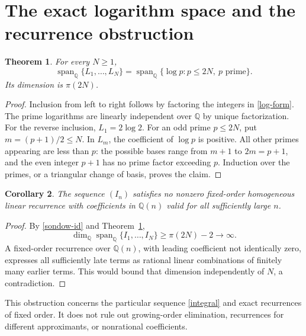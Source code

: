 \documentclass[11pt,a4paper]{article}
\newtheorem{theorem}{Theorem}[section]
\newtheorem{corollary}[theorem]{Corollary}
\theoremstyle{remark}\newtheorem{remark}[theorem]{Remark}
\newcommand{\Q}{\mathbb Q}\newcommand{\Z}{\mathbb Z}
\newcommand{\spanQ}{\operatorname{span}_{\mathbb Q}}
\begin{document}
\section{The exact logarithm space and the recurrence obstruction}
\begin{theorem}\label{log-rank}
For every $N\ge1$,
\[
 \spanQ\{L_1,\ldots,L_N\}
 =\spanQ\{\log p:p\le2N,\ p\text{ prime}\}.
\]
Its dimension is $\pi(2N)$.
\end{theorem}
\begin{proof}
Inclusion from left to right follows by factoring the integers in
\eqref{log-form}. The prime logarithms are linearly independent over $\Q$
by unique factorization. For the reverse inclusion, $L_1=2\log2$.
For an odd prime $p\le2N$, put $m=(p+1)/2\le N$. In $L_m$, the coefficient
of $\log p$ is positive. All other primes appearing are less than $p$:
the possible bases range from $m+1$ to $2m=p+1$, and the even integer
$p+1$ has no prime factor exceeding $p$. Induction over the primes, or a
triangular change of basis, proves the claim.
\end{proof}

\begin{corollary}\label{not-recursive}
The sequence $(I_n)$ satisfies no nonzero fixed-order homogeneous linear
recurrence with coefficients in $\Q(n)$ valid for all sufficiently large $n$.
\end{corollary}
\begin{proof}
By \eqref{sondow-id} and Theorem~\ref{log-rank},
\[
 \dim_{\Q}\spanQ\{I_1,\ldots,I_N\}\ge\pi(2N)-2\longrightarrow\infty.
\]
A fixed-order recurrence over $\Q(n)$, with leading coefficient not identically
zero, expresses all sufficiently late terms as rational linear combinations
of finitely many earlier terms. This would bound that dimension independently
of $N$, a contradiction.
\end{proof}

This obstruction concerns the particular sequence \eqref{integral} and exact
recurrences of fixed order. It does not rule out growing-order elimination,
recurrences for different approximants, or nonrational coefficients.
\end{document}
